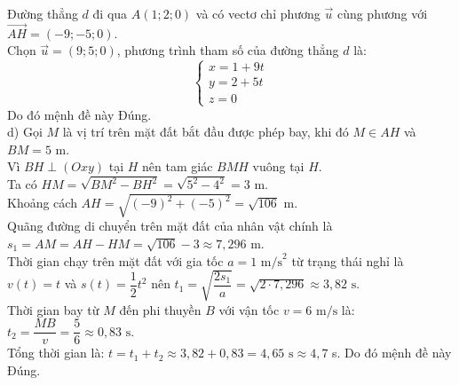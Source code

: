 \begin{ex}
{		Đường thẳng $d$ đi qua $A\left(1; 2; 0\right)$ và có vectơ chỉ phương $\vec{u}$ cùng phương với $\vec{AH} = \left(-9; -5; 0\right)$.\\
		Chọn $\vec{u} = \left(9; 5; 0\right)$, phương trình tham số của đường thẳng $d$ là:
		\[\begin{cases} x = 1 + 9t \\ y = 2 + 5t \\ z = 0 \end{cases}\]
		Do đó mệnh đề này Đúng.\\
		d) Gọi $M$ là vị trí trên mặt đất bắt đầu được phép bay, khi đó $M \in AH$ và $BM = 5\text{ m}$.\\
		Vì $BH \perp \left(Oxy\right)$ tại $H$ nên tam giác $BMH$ vuông tại $H$.\\
		Ta có $HM = \sqrt{BM^2 - BH^2} = \sqrt{5^2 - 4^2} = 3\text{ m}$.\\
		Khoảng cách $AH = \sqrt{\left(-9\right)^2 + \left(-5\right)^2} = \sqrt{106}\text{ m}$.\\
		Quãng đường di chuyển trên mặt đất của nhân vật chính là $s_1 = AM = AH - HM = \sqrt{106} - 3 \approx 7{,}296$ m.\\
		Thời gian chạy trên mặt đất với gia tốc $a = 1\text{ m/s}^2$ từ trạng thái nghỉ là\\ 
		$v(t)=t$ và $s(t)=\dfrac{1}{2}t^2$ nên $t_1 = \sqrt{\dfrac{2s_1}{a}} = \sqrt{2 \cdot 7{,}296} \approx 3{,}82\text{ s}$.\\
		Thời gian bay từ $M$ đến phi thuyền $B$ với vận tốc $v = 6\text{ m/s}$ là:
		$t_2 = \dfrac{MB}{v} = \dfrac{5}{6} \approx 0{,}83\text{ s}$.\\
		Tổng thời gian là:
		$t = t_1 + t_2 \approx 3{,}82 + 0{,}83 = 4{,}65\text{ s} \approx 4{,}7$ s.
		Do đó mệnh đề này Đúng.
	}
\end{ex}
